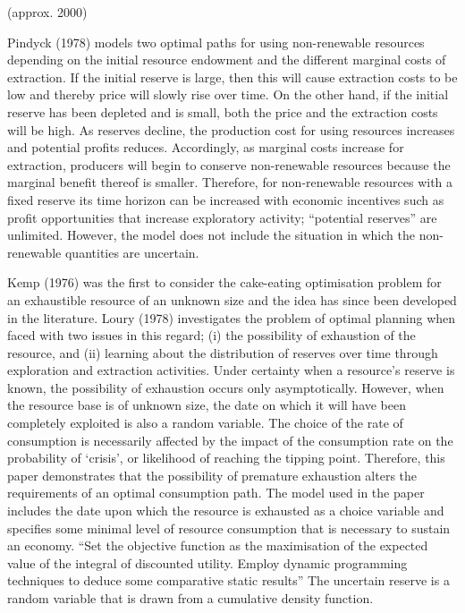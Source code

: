 \documentclass[11pt,preprint, authoryear]{elsarticle}
\numberwithin{equation}{section}
\numberwithin{figure}{section}
\numberwithin{table}{section}
\begin{document}
(approx. 2000)

Pindyck (1978) models two optimal paths for using non-renewable
resources depending on the initial resource endowment and the different
marginal costs of extraction. If the initial reserve is large, then this
will cause extraction costs to be low and thereby price will slowly rise
over time. On the other hand, if the initial reserve has been depleted
and is small, both the price and the extraction costs will be high. As
reserves decline, the production cost for using resources increases and
potential profits reduces. Accordingly, as marginal costs increase for
extraction, producers will begin to conserve non-renewable resources
because the marginal benefit thereof is smaller. Therefore, for
non-renewable resources with a fixed reserve its time horizon can be
increased with economic incentives such as profit opportunities that
increase exploratory activity; ``potential reserves'' are unlimited.
However, the model does not include the situation in which the
non-renewable quantities are uncertain.

Kemp (1976) was the first to consider the cake-eating optimisation
problem for an exhaustible resource of an unknown size and the idea has
since been developed in the literature. Loury (1978) investigates the
problem of optimal planning when faced with two issues in this regard;
(i) the possibility of exhaustion of the resource, and (ii) learning
about the distribution of reserves over time through exploration and
extraction activities. Under certainty when a resource's reserve is
known, the possibility of exhaustion occurs only asymptotically.
However, when the resource base is of unknown size, the date on which it
will have been completely exploited is also a random variable. The
choice of the rate of consumption is necessarily affected by the impact
of the consumption rate on the probability of `crisis', or likelihood of
reaching the tipping point. Therefore, this paper demonstrates that the
possibility of premature exhaustion alters the requirements of an
optimal consumption path. The model used in the paper includes the date
upon which the resource is exhausted as a choice variable and specifies
some minimal level of resource consumption that is necessary to sustain
an economy. ``Set the objective function as the maximisation of the
expected value of the integral of discounted utility. Employ dynamic
programming techniques to deduce some comparative static results'' The
uncertain reserve is a random variable that is drawn from a cumulative
density function.
\end{document}
